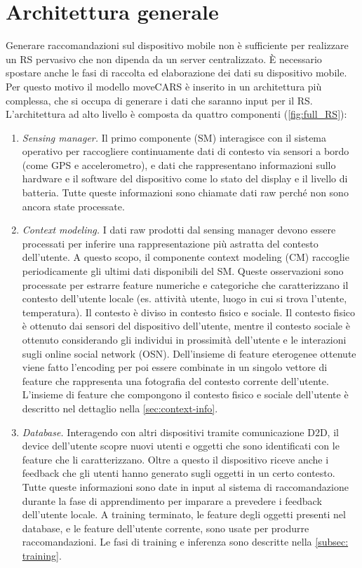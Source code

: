 \documentclass[12pt,italian]{report}
\begin{document}
\section{Architettura generale}
Generare raccomandazioni sul dispositivo mobile non è sufficiente per realizzare un RS pervasivo che non dipenda da un server centralizzato.  \`E necessario spostare anche le fasi di raccolta ed elaborazione dei dati su dispositivo mobile. Per questo motivo il modello moveCARS è inserito in un architettura più complessa, che si occupa di generare i dati che saranno input per il RS.
L'architettura ad alto livello è composta da quattro componenti (\autoref{fig:full_RS}):
\begin{enumerate}
 \item \textit{Sensing manager.} Il primo componente (SM) interagisce con il sistema operativo per raccogliere continuamente dati di contesto via sensori a bordo (come GPS e accelerometro), e dati che rappresentano informazioni sullo hardware e il software del dispositivo come lo stato del display e il livello di batteria. Tutte queste informazioni sono chiamate dati raw perché non sono ancora state processate.
 
 \item \textit{Context modeling.} I dati raw prodotti dal sensing manager devono essere processati per inferire una rappresentazione più astratta del contesto dell'utente. A questo scopo, il componente context modeling (CM) raccoglie periodicamente gli ultimi dati disponibili del SM. Queste osservazioni sono processate per estrarre feature numeriche e categoriche che caratterizzano il contesto dell'utente locale (es. attività utente, luogo in cui si trova l'utente, temperatura). Il contesto è diviso in contesto fisico e sociale. Il contesto fisico è ottenuto  dai sensori del dispositivo dell'utente, mentre il contesto sociale è ottenuto considerando gli individui in prossimità dell'utente e le interazioni sugli online social network (OSN). Dell'insieme di feature eterogenee ottenute viene fatto l'encoding per poi essere combinate in un singolo vettore di feature che rappresenta una fotografia del contesto corrente dell'utente. L'insieme di feature che compongono il contesto fisico e sociale dell'utente è descritto nel dettaglio nella \autoref{sec:context-info}.
 
 \item  \textit{Database.} Interagendo con altri dispositivi tramite comunicazione D2D, il device dell'utente scopre nuovi utenti e oggetti che sono identificati con le feature che li caratterizzano. Oltre a questo il dispositivo riceve anche i feedback che gli utenti hanno generato sugli oggetti in un certo contesto. Tutte queste informazioni sono date in input al sistema di raccomandazione durante la fase di apprendimento per imparare a prevedere i feedback dell'utente locale. A training terminato, le feature degli oggetti presenti nel database, e le feature dell'utente corrente, sono usate per produrre raccomandazioni. Le fasi di training e inferenza sono descritte nella \autoref{subsec: training}.
 

\end{enumerate}
\end{document}
